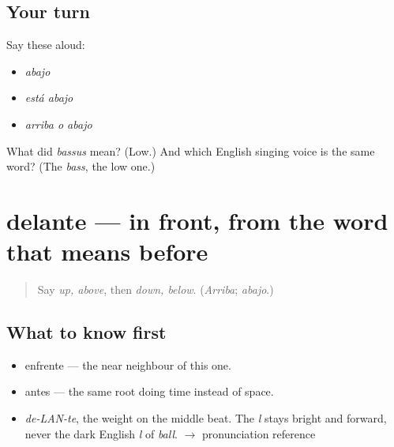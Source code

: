 \subsection*{Your turn}
Say these aloud:

\begin{itemize}
\raggedright
  \item \emph{abajo}
  \item \emph{está abajo}
  \item \emph{arriba o abajo}
\end{itemize}

\begin{tcolorbox}[breakable,colback=teal!4,colframe=teal!35!black,title={Before you move on}]
What did \emph{bassus} mean? (Low.) And which English singing voice is the same word? (The \emph{bass}, the low one.)
\end{tcolorbox}
\section[delante]{delante — in front, from the word that means before}

\label{lesson:ES-C341-delante}



\begin{quote}
Say \emph{up, above}, then \emph{down, below}. (\emph{Arriba}; \emph{abajo}.)
\end{quote}

\subsection*{What to know first}
\begin{itemize}
\raggedright
  \item enfrente — the near neighbour of this one.
  \item antes — the same root doing time instead of space.
\end{itemize}

\begin{sounds}
\begin{itemize}
\raggedright
  \item \emph{de-LAN-te}, the weight on the middle beat. The \emph{l} stays bright and forward, never the dark English \emph{l} of \emph{ball}. $\to$ pronunciation reference
\end{itemize}
\end{sounds}

